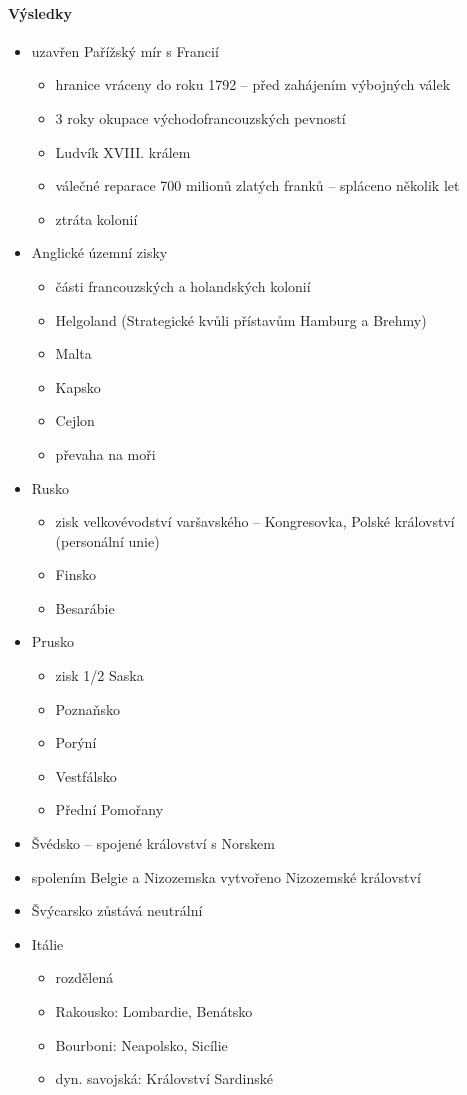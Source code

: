\paragraph{Výsledky}
\begin{itemize}
\item uzavřen Pařížský mír s Francií
	\begin{itemize}
	\item hranice vráceny do roku 1792 -- před zahájením výbojných válek
	\item 3 roky okupace východofrancouzských pevností
	\item Ludvík XVIII. králem
	\item válečné reparace 700 milionů zlatých franků -- spláceno několik let
	\item ztráta kolonií
	\end{itemize}
\item Anglické územní zisky
	\begin{itemize}
	\item části francouzských a holandských kolonií
	\item Helgoland (Strategické kvůli přístavům Hamburg a Brehmy)
	\item Malta
	\item Kapsko
	\item Cejlon
	\item[\ra] převaha na moři
	\end{itemize}
\item Rusko
	\begin{itemize}
	\item zisk velkovévodství varšavského -- Kongresovka, Polské království (personální unie)
	\item Finsko
	\item Besarábie
	\end{itemize}
\item Prusko
	\begin{itemize}
	\item zisk 1/2 Saska
	\item Poznaňsko
	\item Porýní
	\item Vestfálsko
	\item Přední Pomořany
	\end{itemize}
\item Švédsko -- spojené království s Norskem
\item spolením Belgie a Nizozemska vytvořeno Nizozemské království
\item Švýcarsko zůstává neutrální
\item Itálie
	\begin{itemize}
	\item rozdělená
	\item Rakousko: Lombardie, Benátsko
	\item Bourboni: Neapolsko, Sicílie
	\item dyn. savojská: Království Sardinské
	\end{itemize}
\end{itemize}

\newpage
\timeline

